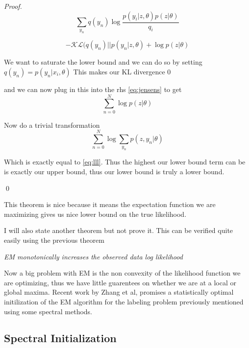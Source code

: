 \begin{theorem}
\begin{proof}
\begin{equation} 
\displaystyle\sum\limits_{y_{n}} q(y_{n}) \log \frac{p(y_{i}|z,\theta)p(z| \theta)}{q_{i}} 
\end{equation}

\begin{equation}
-\mathcal{KL}(q(y_{n}) || p(y_{n} | z, \theta) + \log p(z| \theta)
\end{equation}

We want to saturate the lower bound and we can do so by setting $q(y_{n}) = p(y_{n} | x_{i}, \theta)$ This makes our KL divergence 0

and we can now plug in this into the rhs \eqref{eq:jensens} to get
\begin{equation}
\displaystyle\sum\limits_{n=0}^{N} \log p(z | \theta)
\end{equation}

Now do a trivial transformation
\begin{equation}
\displaystyle\sum\limits_{n=0}^{N} \log \displaystyle\sum\limits_{y_{n}}  p(z,y_{n} | \theta)
\end{equation}

Which is exactly equal to \eqref{eq:lll}. Thus the highest our lower bound term can be is exactly our upper bound, thus our lower bound is truly a lower bound.

\qed
\end{proof}

\end{theorem}

This theorem is nice because it means the expectation function we are maximizing gives us nice lower bound on the true likelihood.


I will also state another theorem but not prove it. This can be verified quite easily using the previous theorem

\begin{theorem}
\emph{EM monotonically increases the observed data log likelihood}
\end{theorem}


Now a big problem with EM is the non convexity of the likelihood function we are optimizing, thus we have little guarentees on whether we are at a local or global maxima. Recent work by Zhang et al, promises a statistically optimal initilization of the EM algorithm for the labeling problem previously mentioned using some spectral methods.

\subsection{Spectral Initialization}

